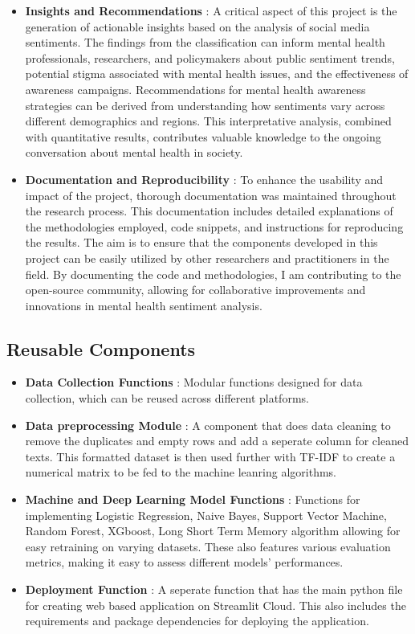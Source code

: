 \begin{itemize}
    \item \textbf{Insights and Recommendations} :
    \noindent
    A critical aspect of this project is the generation of actionable insights based on the analysis of social media sentiments. The findings from the classification can inform mental health professionals, researchers, and policymakers about public sentiment trends, potential stigma associated with mental health issues, and the effectiveness of awareness campaigns. Recommendations for mental health awareness strategies can be derived from understanding how sentiments vary across different demographics and regions. This interpretative analysis, combined with quantitative results, contributes valuable knowledge to the ongoing conversation about mental health in society.
    \item \textbf{Documentation and Reproducibility} :
    \noindent
    To enhance the usability and impact of the project, thorough documentation was maintained throughout the research process. This documentation includes detailed explanations of the methodologies employed, code snippets, and instructions for reproducing the results. The aim is to ensure that the components developed in this project can be easily utilized by other researchers and practitioners in the field. By documenting the code and methodologies, I am contributing to the open-source community, allowing for collaborative improvements and innovations in mental health sentiment analysis.
\end{itemize}

\subsection{Reusable Components}
\begin{itemize}
    \item \textbf{Data Collection Functions} :
    \noindent
    Modular functions designed for data collection, which can be reused across different platforms.
    \item \textbf{Data preprocessing Module} :
    \noindent
    A component that does data cleaning to remove the duplicates and empty rows and add a seperate column for cleaned texts. This formatted dataset is then used further with TF-IDF to create a numerical matrix to be fed to the machine leanring algorithms.
    \item \textbf{Machine and Deep Learning Model Functions} :
    \noindent
    Functions for implementing Logistic Regression, Naive Bayes, Support Vector Machine, Random Forest, XGboost, Long Short Term Memory algorithm allowing for easy retraining on varying datasets. These also features various evaluation metrics, making it easy to assess different models' performances.
    \item \textbf{Deployment Function} :
    \noindent
    A seperate function that has the main python file for creating web based application on Streamlit Cloud. This also includes the requirements and package dependencies for deploying the application.
\end{itemize}

